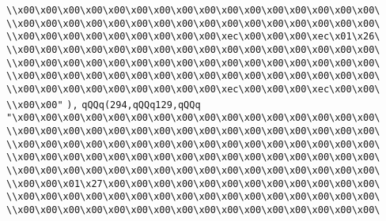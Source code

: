\verb|\\x00\x00\x00\x00\x00\x00\x00\x00\x00\x00\x00\x00\x00\x00\x00\x00\|\newline
\verb|\\x00\x00\x00\x00\x00\x00\x00\x00\x00\x00\x00\x00\x00\x00\x00\x00\|\newline
\verb|\\x00\x00\x00\x00\x00\x00\x00\x00\x00\xec\x00\x00\x00\xec\x01\x26\|\newline
\verb|\\x00\x00\x00\x00\x00\x00\x00\x00\x00\x00\x00\x00\x00\x00\x00\x00\|\newline
\verb|\\x00\x00\x00\x00\x00\x00\x00\x00\x00\x00\x00\x00\x00\x00\x00\x00\|\newline
\verb|\\x00\x00\x00\x00\x00\x00\x00\x00\x00\x00\x00\x00\x00\x00\x00\x00\|\newline
\verb|\\x00\x00\x00\x00\x00\x00\x00\x00\x00\xec\x00\x00\x00\xec\x00\x00\|\newline
\verb|\\x00\x00"|\newline
\verb|),|\newline
\verb|qQQq(294,qQQq129,qQQq|\newline
\verb|"\x00\x00\x00\x00\x00\x00\x00\x00\x00\x00\x00\x00\x00\x00\x00\x00\|\newline
\verb|\\x00\x00\x00\x00\x00\x00\x00\x00\x00\x00\x00\x00\x00\x00\x00\x00\|\newline
\verb|\\x00\x00\x00\x00\x00\x00\x00\x00\x00\x00\x00\x00\x00\x00\x00\x00\|\newline
\verb|\\x00\x00\x00\x00\x00\x00\x00\x00\x00\x00\x00\x00\x00\x00\x00\x00\|\newline
\verb|\\x00\x00\x00\x00\x00\x00\x00\x00\x00\x00\x00\x00\x00\x00\x00\x00\|\newline
\verb|\\x00\x00\x01\x27\x00\x00\x00\x00\x00\x00\x00\x00\x00\x00\x00\x00\|\newline
\verb|\\x00\x00\x00\x00\x00\x00\x00\x00\x00\x00\x00\x00\x00\x00\x00\x00\|\newline
\verb|\\x00\x00\x00\x00\x00\x00\x00\x00\x00\x00\x00\x00\x00\x00\x00\x00\|\newline
